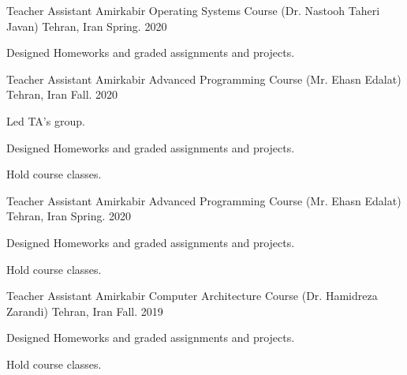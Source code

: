 \begin{cventries}
    \cventry
    {Teacher Assistant} %
    {Amirkabir Operating Systems Course (Dr. Nastooh Taheri Javan)} %
    {Tehran, Iran} %
    {Spring. 2020} %
    {
        \begin{cvitems} %
            \item {Designed Homeworks and graded assignments and projects.}
        \end{cvitems}
    }

    \cventry
    {Teacher Assistant} %
    {Amirkabir Advanced Programming Course (Mr. Ehasn Edalat)} %
    {Tehran, Iran} %
    {Fall. 2020} %
    {
        \begin{cvitems} %
            \item {Led TA's group.}
            \item {Designed Homeworks and graded assignments and projects.}
            \item {Hold course classes.}
        \end{cvitems}
    }

    \cventry
    {Teacher Assistant} %
    {Amirkabir Advanced Programming Course (Mr. Ehasn Edalat)} %
    {Tehran, Iran} %
    {Spring. 2020} %
    {
        \begin{cvitems} %
            \item {Designed Homeworks and graded assignments and projects.}
            \item {Hold course classes.}
        \end{cvitems}
    }

    \cventry
    {Teacher Assistant} %
    {Amirkabir Computer Architecture Course (Dr. Hamidreza Zarandi)} %
    {Tehran, Iran} %
    {Fall. 2019} %
    {
        \begin{cvitems} %
            \item {Designed Homeworks and graded assignments and projects.}
            \item {Hold course classes.}
        \end{cvitems}
    }

\end{cventries}